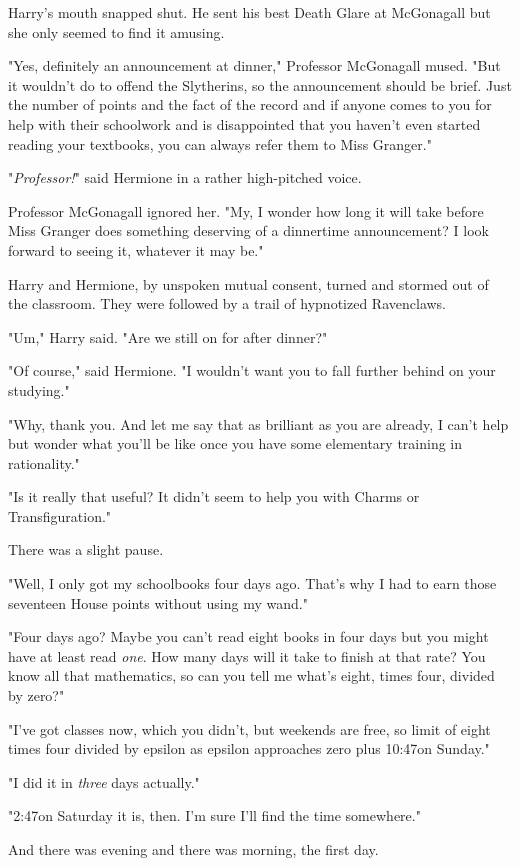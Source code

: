 Harry's mouth snapped shut. He sent his best Death Glare at McGonagall but she
only seemed to find it amusing.

"Yes, definitely an announcement at dinner," Professor McGonagall mused. "But
it wouldn't do to offend the Slytherins, so the announcement should be brief.
Just the number of points and the fact of the record{\el} and if anyone
comes to you for help with their schoolwork and is disappointed that you
haven't even started reading your textbooks, you can always refer them to Miss
Granger."

"\emph{Professor!}" said Hermione in a rather high-pitched voice.

Professor McGonagall ignored her. "My, I wonder how long it will take before
Miss Granger does something deserving of a dinnertime announcement? I look
forward to seeing it, whatever it may be."

Harry and Hermione, by unspoken mutual consent, turned and stormed out of the
classroom. They were followed by a trail of hypnotized Ravenclaws.

"Um," Harry said. "Are we still on for after dinner?"

"Of course," said Hermione. "I wouldn't want you to fall further behind on your
studying."

"Why, thank you. And let me say that as brilliant as you are already, I can't
help but wonder what you'll be like once you have some elementary training in
rationality."

"Is it really that useful? It didn't seem to help you with Charms or
Transfiguration."

There was a slight pause.

"Well, I only got my schoolbooks four days ago. That's why I had to earn those
seventeen House points without using my wand."

"Four days ago? Maybe you can't read eight books in four days but you might
have at least read \emph{one}. How many days will it take to finish at that
rate? You know all that mathematics, so can you tell me what's eight, times
four, divided by zero?"

"I've got classes now, which you didn't, but weekends are free, so{\el}
limit of eight times four divided by epsilon as epsilon approaches zero
plus{\el} 10:47\AM on Sunday."

"I did it in \emph{three} days actually."

"2:47\PM on Saturday it is, then. I'm sure I'll find the time somewhere."

And there was evening and there was morning, the first day.
